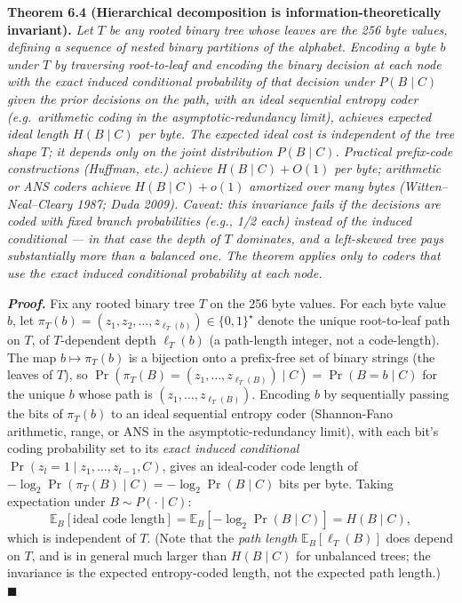 \documentclass[
]{article}
\begin{document}
\textbf{Theorem 6.4 (Hierarchical decomposition is
information-theoretically invariant).} \emph{Let $T$ be any rooted
binary tree whose leaves are the 256 byte values, defining a sequence
of nested binary partitions of the alphabet. Encoding a byte $b$ under
$T$ by traversing root-to-leaf and encoding the binary decision at
each node with the \emph{exact induced conditional probability} of
that decision under $P(B \mid C)$ given the prior decisions on the
path, with an ideal sequential entropy coder (e.g.\ arithmetic
coding in the asymptotic-redundancy limit), achieves expected
\emph{ideal} length $H(B \mid C)$ per byte. The expected ideal cost
is independent of the tree shape $T$; it depends only on the joint
distribution $P(B \mid C)$. Practical prefix-code constructions
(Huffman, etc.) achieve $H(B \mid C) + O(1)$ per byte; arithmetic
or ANS coders achieve $H(B \mid C) + o(1)$ amortized over many
bytes (Witten--Neal--Cleary 1987; Duda 2009). \emph{Caveat:} this
invariance fails if the decisions are coded with fixed branch
probabilities (e.g., 1/2 each) instead of the induced conditional
--- in that case the depth of $T$ dominates, and a left-skewed tree
pays substantially more than a balanced one. The theorem applies
only to coders that use the \emph{exact} induced conditional
probability at each node.}

\emph{\textbf{Proof.}} Fix any rooted binary tree $T$ on the 256
byte values. For each byte value $b$, let $\pi_T(b) = (z_1, z_2,
\ldots, z_{\ell_T(b)}) \in \{0,1\}^\star$ denote the unique
root-to-leaf path on $T$, of $T$-dependent depth $\ell_T(b)$ (a
path-length integer, not a code-length). The map $b \mapsto
\pi_T(b)$ is a bijection onto a prefix-free set of binary strings
(the leaves of $T$), so
$\Pr(\pi_T(B) = (z_1, \dots, z_{\ell_T(B)}) \mid C) = \Pr(B = b \mid C)$
for the unique $b$ whose path is $(z_1, \dots, z_{\ell_T(B)})$.
Encoding $b$ by sequentially passing the bits of $\pi_T(b)$ to an
ideal sequential entropy coder (Shannon-Fano arithmetic, range, or
ANS in the asymptotic-redundancy limit), with each bit's coding
probability set to its \emph{exact induced conditional}
$\Pr(z_l = 1 \mid z_1, \ldots, z_{l-1}, C)$, gives an
ideal-coder code length of
$-\log_2 \Pr(\pi_T(B) \mid C) = -\log_2 \Pr(B \mid C)$ bits per
byte. Taking expectation under $B \sim P(\cdot \mid C)$:
\[
\mathbb{E}_B[\text{ideal code length}] = \mathbb{E}_B[-\log_2 \Pr(B \mid C)] = H(B \mid C),
\]
which is independent of $T$. (Note that the \emph{path length}
$\mathbb{E}_B[\ell_T(B)]$ does depend on $T$, and is in general
much larger than $H(B \mid C)$ for unbalanced trees; the
invariance is the expected entropy-coded length, not the expected
path length.) \hfill$\blacksquare$
\end{document}
